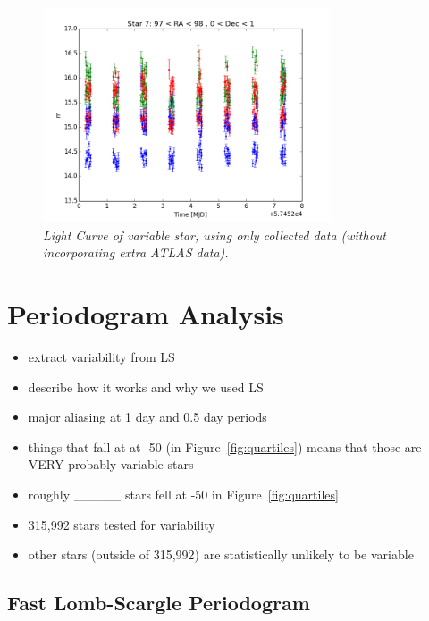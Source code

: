 \documentclass[aps,prl,twocolumn,superscriptaddress]{revtex4-1}
\begin{document}
\begin{figure}[H]
 \centering
 	\includegraphics[width=3.35in]{figures/LC/star7_97_98_0_1_restricted.png}
 \caption{\it \small{Light Curve of variable star, using only collected data (without incorporating extra ATLAS data).}}
 \label{fig:restrictedLC7}
\end{figure}




\section{Periodogram Analysis}
\begin{itemize}
	\item{} extract variability from LS
	\item{} describe how it works and why we used LS
	\item{} major aliasing at 1 day and 0.5 day periods
	\item{} things that fall at at -50 (in Figure~\ref{fig:quartiles}) means that those are VERY probably variable stars
	\item{} roughly \_\_\_\_\_ stars fell at -50 in Figure~\ref{fig:quartiles}
	\item{} 315,992 stars tested for variability
	\item{} other stars (outside of 315,992) are statistically unlikely to be variable
\end{itemize}

\subsection{Fast Lomb-Scargle Periodogram}
\end{document}
